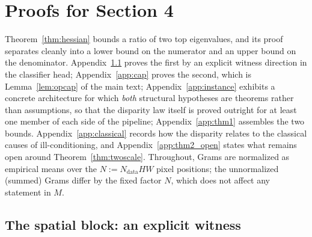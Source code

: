 
\section{Proofs for Section 4}
\label{app:proofs}

Theorem~\ref{thm:hessian} bounds a ratio of two top eigenvalues, and its
proof separates cleanly into a lower bound on the numerator and an upper
bound on the denominator. Appendix~\ref{app:witness} proves the first by
an explicit witness direction in the classifier head; Appendix~\ref{app:cap}
proves the second, which is Lemma~\ref{lem:opcap} of the main text;
Appendix~\ref{app:instance} exhibits a concrete architecture for which
\emph{both} structural hypotheses are theorems rather than assumptions, so
that the disparity law itself is proved outright for at least one member of
each side of the pipeline; Appendix~\ref{app:thm1} assembles the two bounds.
Appendix~\ref{app:classical} records how the disparity relates to the
classical causes of ill-conditioning, and Appendix~\ref{app:thm2_open} states
what remains open around Theorem~\ref{thm:twoscale}. Throughout, Grams are
normalized as empirical means over the $N := N_{\mathrm{data}} HW$ pixel
positions; the unnormalized (summed) Grams differ by the fixed factor $N$,
which does not affect any statement in $M$.

\subsection{The spatial block: an explicit witness}
\label{app:witness}

